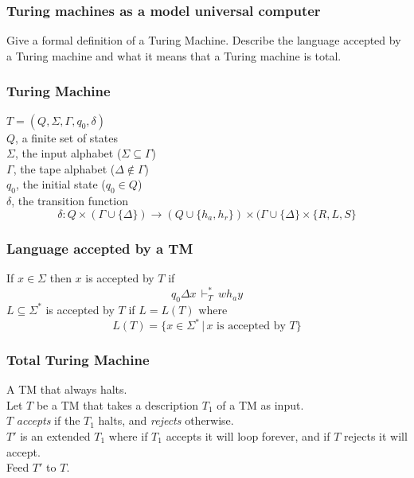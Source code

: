 

\begin{frame}
    \frametitle{Turing machines as a model universal computer}
    Give a formal definition of a Turing Machine. Describe the language
    accepted by a Turing machine and what it means that a Turing machine is
    total.
\end{frame}

\begin{frame}
    \frametitle{Turing Machine}
    $T = (Q, \Sigma, \Gamma, q_0, \delta)$\\

    \vspace{10 pt}
    $Q$, a finite set of states\\
    $\Sigma$, the input alphabet ($\Sigma \subseteq \Gamma$)\\
    $\Gamma$, the tape alphabet ($\Delta \not\in \Gamma$)\\
    $q_0$, the initial state ($q_0 \in Q$)\\
    $\delta$, the transition function\\
    \[\delta: Q \times (\Gamma \cup \{\Delta\}) \rightarrow (Q \cup \{h_a,
    h_r\}) \times (\Gamma \cup \{\Delta\} \times \{R, L, S\}\]
\end{frame}

\begin{frame}
    \frametitle{Language accepted by a TM}
    If $x \in \Sigma$ then $x$ is accepted by $T$ if
    \[q_0 \Delta x \,\vdash^{\ast}_{T}\, w h_a y\]
    $L \subseteq \Sigma^\ast$ is accepted by $T$ if $L = L(T)$ where
    \[L(T) = \{x \in \Sigma^\ast \,|\, x \text{ is accepted by } T\}\]
\end{frame}

\begin{frame}
    \frametitle{Total Turing Machine}
    A TM that always halts.\\
    \pause
    \vspace{10pt}
    Let $T$ be a TM that takes a description $T_1$ of a TM as input.\\
    $T$ \emph{accepts} if the $T_1$ halts, and \emph{rejects} otherwise.\\
    \pause
    $T'$ is an extended $T_1$ where if $T_1$ accepts it will loop forever, and
    if $T$ rejects it will accept.\\
    \pause
    Feed $T'$ to $T$.
\end{frame}


